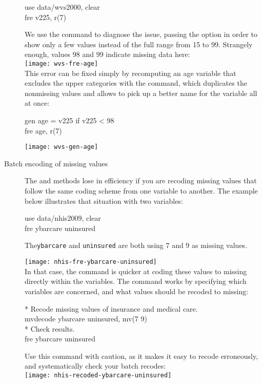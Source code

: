 \begin{description}
	\begin{docspec}
		use data/wvs2000, clear\\
		fre v225, r(7)
	\end{docspec}
	
	We use the  command to diagnose the issue, passing the  option in order to show only a few values instead of the full range from 15 to 99. Strangely enough, values 98 and 99 indicate missing data here:\\[1em]

		\texttt{[image: wvs-fre-age]}\\[1em]
	
	This error can be fixed simply by recomputing an age variable that excludes the upper categories with the  command, which duplicates the nonmissing values and allows to pick up a better name for the variable all at once:

	\begin{docspec}
		gen age = v225 if v225 < 98\\
		fre age, r(7)
	\end{docspec}

\texttt{[image: wvs-gen-age]}\\[1em]

	\item[Batch encoding of missing values]%
	The  and  methods lose in efficiency if you are recoding missing values that follow the same coding scheme from one variable to another. The example below illustrates that situation with two \NHIS variables:\\[1em]

	\begin{docspec}
		use data/nhis2009, clear\\
		fre ybarcare uninsured
	\end{docspec}
	
	The\texttt{ybarcare} and \texttt{uninsured} are both using 7 and 9 as missing values.
	
	\texttt{[image: nhis-fre-ybarcare-uninsured]}\\[1em]

	In that case, the  command is quicker at coding these values to missing directly within the variables. The command works by specifying which variables are concerned, and what values should be recoded to missing:

	\begin{docspec}
		* Recode missing values of insurance and medical care.\\%
		mvdecode ybarcare uninsured, mv(7 9)\\[1em]%
		* Check results.\\%
		fre ybarcare uninsured\\%
	\end{docspec}
	
	Use this command with caution, as it makes it easy to recode erroneously, and systematically check your batch recodes:\\[1em]%

	\texttt{[image: nhis-recoded-ybarcare-uninsured]}
\end{description}

